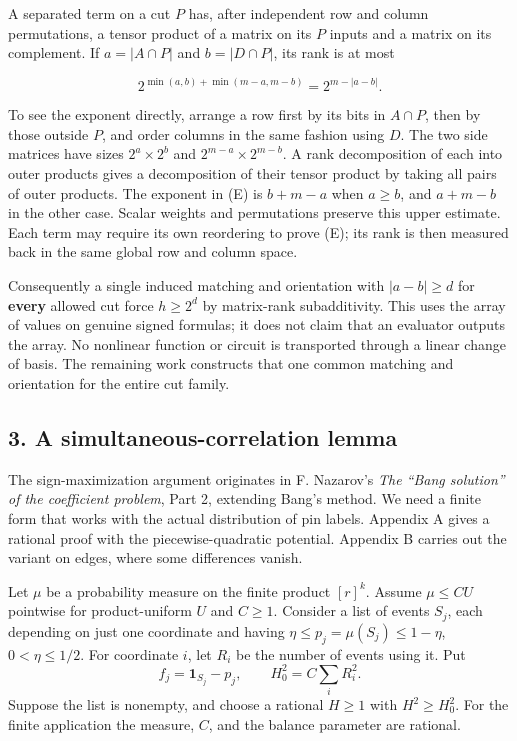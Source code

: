 \documentclass[
  11pt,
]{article}
\begin{document}
A separated term on a cut \(P\) has, after independent row and column
permutations, a tensor product of a matrix on its \(P\) inputs and a
matrix on its complement. If \(a=|A\cap P|\) and \(b=|D\cap P|\), its
rank is at most

\[
2^{\min(a,b)+\min(m-a,m-b)}=2^{m-|a-b|}.
\tag{E}
\]

To see the exponent directly, arrange a row first by its bits in
\(A\cap P\), then by those outside \(P\), and order columns in the same
fashion using \(D\). The two side matrices have sizes \(2^a\times2^b\)
and \(2^{m-a}\times2^{m-b}\). A rank decomposition of each into
outer products gives a decomposition of their tensor product by taking
all pairs of outer products. The exponent in (E) is \(b+m-a\) when
\(a\ge b\), and \(a+m-b\) in the other case. Scalar weights and
permutations preserve this upper estimate. Each term may require its
own reordering to prove (E); its rank is then measured back in the same
global row and column space.

Consequently a single induced matching and orientation with
\(|a-b|\ge d\) for \textbf{every} allowed cut force \(h\ge2^d\) by
matrix-rank subadditivity. This uses the array of values on genuine
signed formulas; it does not claim that an evaluator outputs the array.
No nonlinear function or circuit is transported through a linear change
of basis. The remaining work constructs that one common matching and
orientation for the entire cut family.

\subsection{3. A simultaneous-correlation
lemma}\label{a-simultaneous-correlation-lemma}

The sign-maximization argument originates in F. Nazarov's
\emph{The ``Bang solution'' of the coefficient problem}, Part 2, extending
Bang's method. We need a finite form that works with the actual
distribution of pin labels. Appendix A gives a rational proof with the
piecewise-quadratic potential. Appendix B carries out the variant on
edges, where some differences vanish.

Let \(\mu\) be a probability measure on the finite product \([r]^k\).
Assume \(\mu\le C U\) pointwise for product-uniform \(U\) and \(C\ge1\).
Consider a list of events \(S_j\), each depending on just one coordinate
and having \(\eta\le p_j=\mu(S_j)\le1-\eta\), \(0<\eta\le1/2\). For
coordinate \(i\), let \(R_i\) be the number of events using it. Put \[
         f_j=\mathbf1_{S_j}-p_j,\qquad H_0^2=C\sum_i R_i^2.
\] Suppose the list is nonempty, and choose a rational \(H\ge1\) with \(H^2\ge H_0^2\). For the finite application the measure, \(C\), and the balance parameter are rational.
\end{document}
